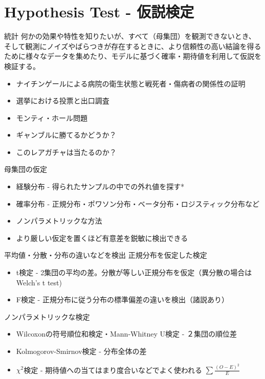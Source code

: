 \documentclass[cjk, aspectratio=169]{beamer}
\begin{document}
\section{Hypothesis Test - 仮説検定}
    \begin{frame}{統計}
    何かの効果や特性を知りたいが、すべて（母集団）を観測できないとき、そして観測にノイズやばらつきが存在するときに、より信頼性の高い結論を得るために様々なデータを集めたり、モデルに基づく確率・期待値を利用して仮説を検証する。
    \begin{itemize}
    \item ナイチンゲールによる病院の衛生状態と戦死者・傷病者の関係性の証明
    \item 選挙における投票と出口調査
    \item モンティ・ホール問題
    \item ギャンブルに勝てるかどうか？
    \item このレアガチャは当たるのか？
    \end{itemize}
    \end{frame}

    \begin{frame}{母集団の仮定}
    \begin{itemize}
    \item 経験分布 - 得られたサンプルの中での外れ値を探す*
    \item 確率分布 - 正規分布・ポワソン分布・ベータ分布・ロジスティック分布など
    \item ノンパラメトリックな方法
    \item より厳しい仮定を置くほど有意差を鋭敏に検出できる
    \end{itemize}
    \end{frame}

    \begin{frame}{平均値・分散・分布の違いなどを検出}
    正規分布を仮定した検定
    \begin{itemize}
    \item t検定 - 2集団の平均の差。分散が等しい正規分布を仮定（異分散の場合はWelch's t test)
    \item F検定 - 正規分布に従う分布の標準偏差の違いを検出（諸説あり）
    \end{itemize}
    ノンパラメトリックな検定
    \begin{itemize}
    \item Wilcoxonの符号順位和検定・Mann-Whitney U検定 - ２集団の順位差
    \item Kolmogorov-Smirnov検定 - 分布全体の差
    \item $\chi^{2}$検定 - 期待値への当てはまり度合いなどでよく使われる $\sum \frac{(O-E)^2}{E}$
    \end{itemize}
    \end{frame}
\end{document}
